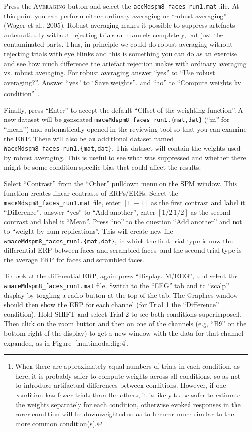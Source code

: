 Press the \textsc{Averaging} button and select the \texttt{aceMdspm8\_faces\_run1.mat} file. At this point you can perform either ordinary averaging or ``robust averaging'' (Wager et al., 2005). Robust averaging makes it possible to suppress artefacts automatically without rejecting trials or channels completely, but just the contaminated parts. Thus, in principle we could do robust averaging without rejecting trials with eye blinks and this is something you can do as an exercise and see how much difference the artefact rejection makes with ordinary averaging vs. robust averaging. For robust averaging answer ``yes'' to ``Use robust averaging?''. Answer ``yes'' to ``Save weights'', and ``no'' to ``Compute weights by condition''\footnote{When there are approximately equal numbers of trials in each condition, as here, it is probably safer to compute weights across all conditions, so as not to introduce artifactual differences between conditions. However, if one condition has fewer trials than the others, it is likely to be safer to estimate the weights separately for each condition, otherwise evoked responses in the rarer condition will be downweighted so as to become more similar to the more common condition(s).}.

Finally, press ``Enter'' to accept the default ``Offset of the weighting function''. A new dataset will be generated \texttt{maceMdspm8\_faces\_run1.\{mat,dat\}} (``m'' for ``mean'') and automatically opened in the reviewing tool so that you can examine the ERP. There will also be an additional dataset named \texttt{WaceMdspm8\_faces\_run1.\{mat,dat\}}. This dataset will contain the weights used by robust averaging. This is useful to see what was suppressed and whether there might be some condition-specific bias that could affect the results.

Select ``Contrast'' from the ``Other'' pulldown menu on the SPM window. This function creates linear contrasts of ERPs/ERFs. Select the \texttt{maceMdspm8\_\-faces\_\-run1.mat} file,  enter $[1\: -1]$ as the first contrast and label it ``Difference'', answer ``yes'' to ``Add another'',  enter $[1/2\: 1/2]$ as the second contrast and label it ``Mean''. Press ``no'' to the question ``Add another'' and not to ``weight by num replications''. This will create new file \texttt{wmaceMdspm8\_faces\_run1.\{mat,dat\}}, in which the first trial-type is now the differential ERP between faces and scrambled faces, and the second trial-type is the average ERP for faces and scrambled faces.

To look at the differential ERP, again press ``Display: M/EEG'', and select the \texttt{wmaceMdspm8\_\-faces\_\-run1.mat} file. Switch to the ``EEG'' tab and to ``scalp'' display by toggling a radio button at the top of the tab. The Graphics window should then show the ERP for each channel (for Trial 1 the ``Difference'' condition). Hold SHIFT and select Trial 2 to see both conditions superimposed. Then click on the zoom button and then on one of the channels (e.g, ``B9'' on the bottom right of the display) to get a new window with the data for that channel expanded, as in Figure~\ref{multimodal:fig:4}.

